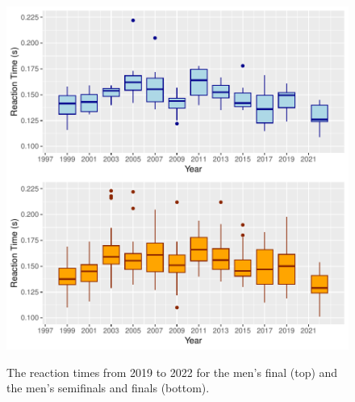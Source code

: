 \documentclass[12pt, letterpaper, titlepage]{article}
\begin{document}
\begin{figure}[tbp]
  \centering
  \includegraphics{Finals_Pooled_Boxplot}
  \label{fig:Boxplots}
  \caption{The reaction times from 2019 to 2022 for the men's final (top) and
  the men's semifinals and finals (bottom).}
\end{figure}
\end{document}
